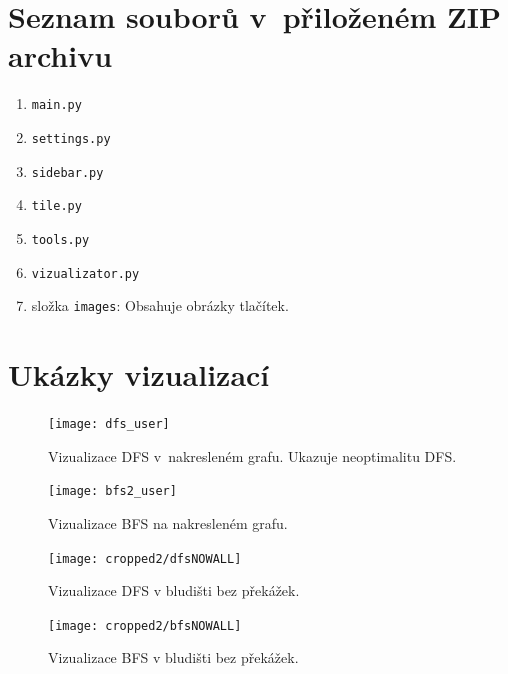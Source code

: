 \documentclass[12pt]{report}			%
\begin{document}
    \begin{appendices}
    \chapter*{Seznam souborů v~přiloženém ZIP archivu}
    \begin{enumerate}
    \item \texttt{main.py}
    \item \texttt{settings.py}
    \item \texttt{sidebar.py}
	\item \texttt{tile.py}
    \item \texttt{tools.py}
	\item \texttt{vizualizator.py}
	\item složka  \texttt{images}: Obsahuje obrázky tlačítek.
    \end{enumerate}
	\chapter{Ukázky vizualizací}\label{priloha_vizualizace}
	
\begin{figure}[h]
\begin{minipage}[outer sep=0]{\textwidth}
\begin{minipage}[t]{0.45\textwidth}
			
			\texttt{[image: dfs\_user]}\caption{Vizualizace DFS v~nakresleném grafu. Ukazuje neoptimalitu DFS.}\label{dfs_user}
			
    \end{minipage}\hfill
    \begin{minipage}[t]{0.45\textwidth}
\texttt{[image: bfs2\_user]}\caption{Vizualizace BFS na nakresleném grafu.}\label{bfs2_user}
    \end{minipage}
    \end{minipage}\vspace{1ex}
    
    \begin{minipage}[outer sep=0]{\textwidth}
\begin{minipage}[t]{0.45\textwidth}
			
			\texttt{[image: cropped2/dfsNOWALL]}\caption{Vizualizace DFS v bludišti bez překážek.}\label{dfs_user}
			
    \end{minipage}\hfill
    \begin{minipage}[t]{0.45\textwidth}
\texttt{[image: cropped2/bfsNOWALL]}\caption{Vizualizace BFS v bludišti bez překážek.}\label{bfs2_user}
    \end{minipage}
    \end{minipage}\vspace{1ex}
    

\end{figure}
\end{appendices}
\end{document}
